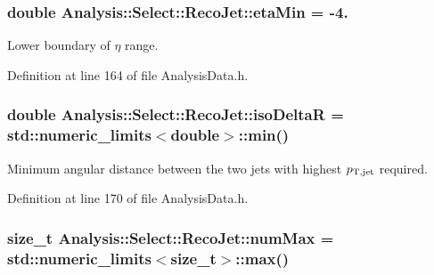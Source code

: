 \subsubsection[{\texorpdfstring{eta\+Min}{etaMin}}]{\setlength{\rightskip}{0pt plus 5cm}double Analysis\+::\+Select\+::\+Reco\+Jet\+::eta\+Min = -\/4.\hspace{0.3cm}{\ttfamily [static]}}\hypertarget{namespaceAnalysis_1_1Select_1_1RecoJet_ac41d804583ac29fe7c1f64a692b8a747}{}\label{namespaceAnalysis_1_1Select_1_1RecoJet_ac41d804583ac29fe7c1f64a692b8a747}


Lower boundary of $ \eta $ range. 



Definition at line 164 of file Analysis\+Data.\+h.

\subsubsection[{\texorpdfstring{iso\+DeltaR}{isoDeltaR}}]{\setlength{\rightskip}{0pt plus 5cm}double Analysis\+::\+Select\+::\+Reco\+Jet\+::iso\+DeltaR = std\+::numeric\+\_\+limits$<$double$>$\+::min()\hspace{0.3cm}{\ttfamily [static]}}\hypertarget{namespaceAnalysis_1_1Select_1_1RecoJet_a731f85162ee98774ae0a5f52aab27498}{}\label{namespaceAnalysis_1_1Select_1_1RecoJet_a731f85162ee98774ae0a5f52aab27498}


Minimum angular distance between the two jets with highest $ p_{\rm T,jet} $ required. 



Definition at line 170 of file Analysis\+Data.\+h.

\subsubsection[{\texorpdfstring{num\+Max}{numMax}}]{\setlength{\rightskip}{0pt plus 5cm}size\+\_\+t Analysis\+::\+Select\+::\+Reco\+Jet\+::num\+Max = std\+::numeric\+\_\+limits$<$size\+\_\+t$>$\+::max()\hspace{0.3cm}{\ttfamily [static]}}\hypertarget{namespaceAnalysis_1_1Select_1_1RecoJet_a2ebaef4812757f83c5b2a29519e93e6d}{}\label{namespaceAnalysis_1_1Select_1_1RecoJet_a2ebaef4812757f83c5b2a29519e93e6d}


